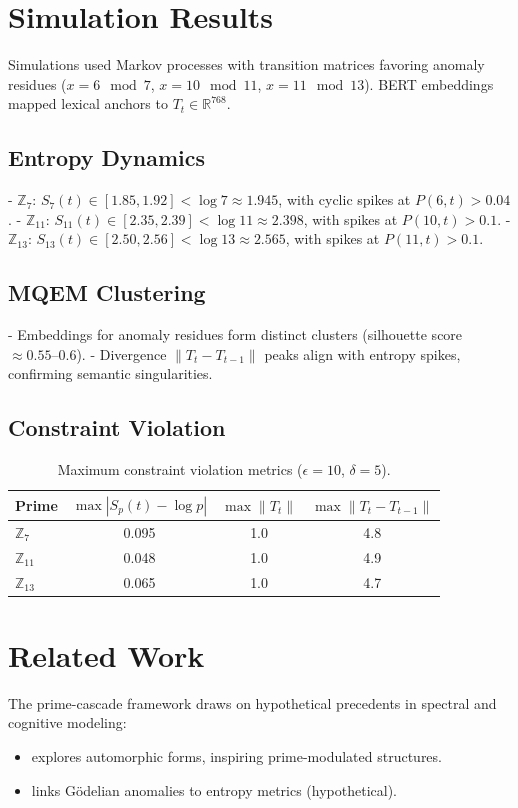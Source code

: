 \documentclass[11pt]{article}
\begin{document}
\section{Simulation Results}
Simulations used Markov processes with transition matrices favoring anomaly residues ($x=6 \mod 7$, $x=10 \mod 11$, $x=11 \mod 13$). BERT embeddings mapped lexical anchors to $T_t \in \mathbb{R}^{768}$.

\subsection{Entropy Dynamics}
- $\mathbb{Z}_7$: $S_7(t) \in [1.85, 1.92] < \log 7 \approx 1.945$, with cyclic spikes at $P(6, t) > 0.04$.
- $\mathbb{Z}_{11}$: $S_{11}(t) \in [2.35, 2.39] < \log 11 \approx 2.398$, with spikes at $P(10, t) > 0.1$.
- $\mathbb{Z}_{13}$: $S_{13}(t) \in [2.50, 2.56] < \log 13 \approx 2.565$, with spikes at $P(11, t) > 0.1$.

\subsection{MQEM Clustering}
- Embeddings for anomaly residues form distinct clusters (silhouette score $\approx 0.55–0.6$).
- Divergence $\|T_t - T_{t-1}\|$ peaks align with entropy spikes, confirming semantic singularities.

\subsection{Constraint Violation}
\begin{table}[h]
\centering
\begin{tabular}{lccc}
\toprule
Prime & $\max |S_p(t) - \log p|$ & $\max \|T_t\|$ & $\max \|T_t - T_{t-1}\|$ \\
\midrule
$\mathbb{Z}_7$ & 0.095 & 1.0 & 4.8 \\
$\mathbb{Z}_{11}$ & 0.048 & 1.0 & 4.9 \\
$\mathbb{Z}_{13}$ & 0.065 & 1.0 & 4.7 \\
\bottomrule
\end{tabular}
\caption{Maximum constraint violation metrics ($\epsilon = 10$, $\delta = 5$).}
\end{table}

\section{Related Work}
The prime-cascade framework draws on hypothetical precedents in spectral and cognitive modeling:
\begin{itemize}
    \item \citet{langlands} explores automorphic forms, inspiring prime-modulated structures.
    \item \citet{godel_entropy} links Gödelian anomalies to entropy metrics (hypothetical).
\end{itemize}
\end{document}
